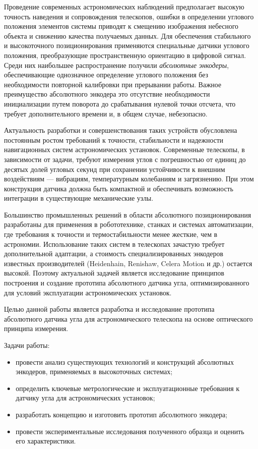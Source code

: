 Проведение современных астрономических наблюдений предполагает высокую точность наведения и сопровождения телескопов, ошибки в определении углового положения элементов системы приводят к смещению изображения небесного объекта и снижению качества получаемых данных. Для обеспечения стабильного и высокоточного позиционирования применяются специальные датчики углового положения, преобразующие пространственную ориентацию в цифровой сигнал. Среди них наибольшее распространение получили \emph{абсолютные энкодеры}, обеспечивающие однозначное определение углового положения без необходимости повторной калибровки при прерывании работы. Важное преимущество абсолютного энкодера это отсутствие необходимости инициализации путем поворота до срабатывания нулевой точки отсчета, что требует дополнительного времени и, в общем случае, небезопасно.

Актуальность разработки и совершенствования таких устройств обусловлена постоянным ростом требований к точности, стабильности и надежности навигационных систем астрономических установок. Современные телескопы, в зависимости от задачи, требуют измерения углов с погрешностью от единиц до десятых долей угловых секунд при сохранении устойчивости к внешним воздействиям --- вибрациям, температурным колебаниям и загрязнению. При этом конструкция датчика должна быть компактной и обеспечивать возможность интеграции в существующие механические узлы.

Большинство промышленных решений в области абсолютного позиционирования разработаны для применения в робототехнике, станках и системах автоматизации, где требования к точности и термостабильности менее жесткие, чем в астрономии. Использование таких систем в телескопах зачастую требует дополнительной адаптации, а стоимость специализированных энкодеров известных производителей (Heidenhain, Renishaw, Celera Motion и др.) остается высокой. Поэтому актуальной задачей является исследование принципов построения и создание прототипа абсолютного датчика угла, оптимизированного для условий эксплуатации астрономических установок.  

Целью данной работы является разработка и исследование прототипа абсолютного датчика угла для астрономического телескопа на основе оптического принципа измерения.

Задачи работы:
\begin{itemize}
    \item провести анализ существующих технологий и конструкций абсолютных энкодеров, применяемых в высокоточных системах;  
    \item определить ключевые метрологические и эксплуатационные требования к датчику угла для астрономических установок;  
    \item разработать концепцию и изготовить прототип абсолютного энкодера; 
    \item провести экспериментальные исследования полученного образца и оценить его характеристики.  
\end{itemize}

